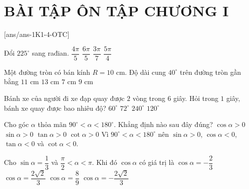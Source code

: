 
\section*{BÀI TẬP ÔN TẬP CHƯƠNG I}
[ans/ans-1K1-4-OTC]
\begin{ex}%
	Đổi $225^\circ$ sang rađian.
	\choice
	{$\dfrac{4\pi}{5}$}
	{$\dfrac{6\pi}{5}$}
	{$\dfrac{3\pi}{7}$}
	{\True $\dfrac{5\pi}{4}$}
\end{ex}
\begin{ex}%
	Một đường tròn có bán kính $R=10$ cm. Độ dài cung $40^\circ$ trên đường tròn gần bằng
	\choice
	{$11$ cm}
	{$13$ cm}
	{\True $7$ cm}
	{$9$ cm}
\end{ex}
\begin{ex}%
	Bánh xe của người đi xe đạp quay được $2$ vòng trong $6$ giây. Hỏi trong $1$ giây, bánh xe quay được bao nhiêu độ?
	\choice
	{$60^\circ$}
	{$72^\circ$}
	{$240^\circ$}
	{\True $120^\circ$}
\end{ex}
\begin{ex}%
	Cho góc $\alpha$ thỏa mãn $90^\circ <\alpha <180^\circ$. Khẳng định nào sau đây đúng?
	\choice
	{$\cos\alpha>0$}
	{\True $\sin\alpha>0$}
	{$\tan\alpha>0$}
	{$\cot\alpha>0$}
	\loigiai
	{Vì $90^\circ <\alpha <180^\circ$ nên $\sin\alpha>0$, $\cos\alpha<0$, $\tan\alpha<0$ và $\cot\alpha<0$.}
\end{ex}
\begin{ex}%
	Cho $\sin \alpha =\dfrac{1}{3}$ và $\dfrac{\pi}{2}<\alpha<\pi$. Khi đó $\cos \alpha$ có giá trị là
	\choice
	{$\cos \alpha =-\dfrac{2}{3}$}
	{$\cos \alpha =\dfrac{2\sqrt{2}}{3}$}
	{$\cos \alpha =\dfrac{8}{9}$}
	{\True $\cos \alpha =-\dfrac{2\sqrt{2}}{3}$}
\end{ex}
